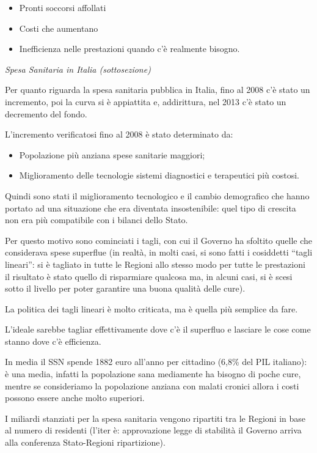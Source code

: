 \documentclass[]{article}
\begin{document}
\begin{itemize}
\item
  Pronti soccorsi affollati
\item
  Costi che aumentano
\item
  Inefficienza nelle prestazioni quando c'è realmente bisogno.
\end{itemize}

\emph{Spesa Sanitaria in Italia (sottosezione)}

Per quanto riguarda la spesa sanitaria pubblica in Italia, fino al 2008
c'è stato un incremento, poi la curva si è appiattita e, addirittura,
nel 2013 c'è stato un decremento del fondo.

L'incremento verificatosi fino al 2008 è stato determinato da:

\begin{itemize}
\item
  Popolazione più anziana spese sanitarie maggiori;
\item
  Miglioramento delle tecnologie sistemi diagnostici e terapeutici più
  costosi.
\end{itemize}

Quindi sono stati il miglioramento tecnologico e il cambio demografico
che hanno portato ad una situazione che era diventata insostenibile:
quel tipo di crescita non era più compatibile con i bilanci dello Stato.

Per questo motivo sono cominciati i tagli, con cui il Governo ha
sfoltito quelle che considerava spese superflue (in realtà, in molti
casi, si sono fatti i cosiddetti ``tagli lineari'': si è tagliato in
tutte le Regioni allo stesso modo per tutte le prestazioni il risultato
è stato quello di risparmiare qualcosa ma, in alcuni casi, si è scesi
sotto il livello per poter garantire una buona qualità delle cure).

La politica dei tagli lineari è molto criticata, ma è quella più
semplice da fare.

L'ideale sarebbe tagliar effettivamente dove c'è il superfluo e lasciare
le cose come stanno dove c'è efficienza.

In media il SSN spende 1882 euro all'anno per cittadino (6,8\% del PIL
italiano): è una media, infatti la popolazione sana mediamente ha
bisogno di poche cure, mentre se consideriamo la popolazione anziana con
malati cronici allora i costi possono essere anche molto superiori.

I miliardi stanziati per la spesa sanitaria vengono ripartiti tra le
Regioni in base al numero di residenti (l'iter è: approvazione legge di
stabilità il Governo arriva alla conferenza Stato-Regioni ripartizione).
\end{document}
